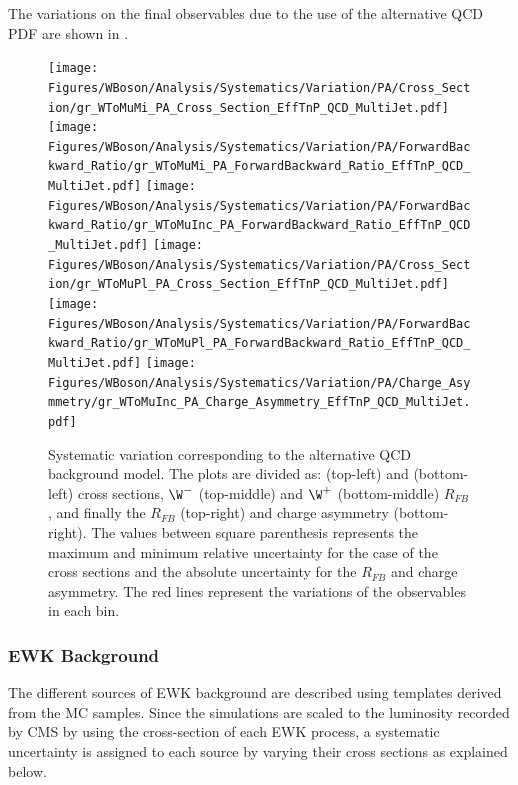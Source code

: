 The variations on the final observables due to the use of the alternative QCD PDF are shown in .

\begin{figure}[htbp]
 \begin{center}
  \texttt{[image: Figures/WBoson/Analysis/Systematics/Variation/PA/Cross\_Section/gr\_WToMuMi\_PA\_Cross\_Section\_EffTnP\_QCD\_MultiJet.pdf]}
  \texttt{[image: Figures/WBoson/Analysis/Systematics/Variation/PA/ForwardBackward\_Ratio/gr\_WToMuMi\_PA\_ForwardBackward\_Ratio\_EffTnP\_QCD\_MultiJet.pdf]}
  \texttt{[image: Figures/WBoson/Analysis/Systematics/Variation/PA/ForwardBackward\_Ratio/gr\_WToMuInc\_PA\_ForwardBackward\_Ratio\_EffTnP\_QCD\_MultiJet.pdf]}
  \texttt{[image: Figures/WBoson/Analysis/Systematics/Variation/PA/Cross\_Section/gr\_WToMuPl\_PA\_Cross\_Section\_EffTnP\_QCD\_MultiJet.pdf]}
  \texttt{[image: Figures/WBoson/Analysis/Systematics/Variation/PA/ForwardBackward\_Ratio/gr\_WToMuPl\_PA\_ForwardBackward\_Ratio\_EffTnP\_QCD\_MultiJet.pdf]}
  \texttt{[image: Figures/WBoson/Analysis/Systematics/Variation/PA/Charge\_Asymmetry/gr\_WToMuInc\_PA\_Charge\_Asymmetry\_EffTnP\_QCD\_MultiJet.pdf]}
 \end{center}
 \caption{Systematic variation corresponding to the alternative QCD background model. The plots are divided as: \WToMuNuMi (top-left) and \WToMuNuPl (bottom-left) cross sections, $\W^{-}$ (top-middle) and $\W^{+}$ (bottom-middle) $R_{FB}$, and finally the \W $R_{FB}$ (top-right) and \W charge asymmetry (bottom-right). The values between square parenthesis represents the maximum and minimum relative uncertainty for the case of the cross sections and the absolute uncertainty for the $R_{FB}$ and charge asymmetry. The red lines represent the variations of the observables in each bin.}
 \label{fig:Systematic_QCD_MultiJet}
\end{figure}

\clearpage
\subsubsection{EWK Background}

The different sources of EWK background are described using templates derived from the MC \POWHEG samples. Since the simulations are scaled to the luminosity recorded by CMS by using the cross-section of each EWK process, a systematic uncertainty is assigned to each source by varying their cross sections as explained below.

